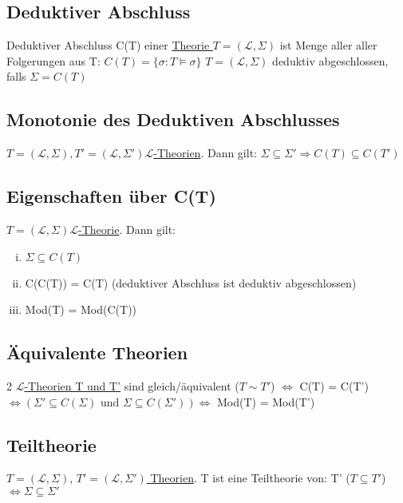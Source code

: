 \documentclass[12pt,a4paper]{article} %
\begin{document}
	\subsection{Deduktiver Abschluss}
	Deduktiver Abschluss C(T) einer \hyperref[Theorie]{Theorie $T = (\mathcal{L}, \Sigma)$} ist Menge aller aller Folgerungen aus T: $C(T) = \{\sigma : T \hyperref[Erfullbar]{\vDash} \sigma\}$ \newline
	$T = (\mathcal{L}, \Sigma)$ deduktiv abgeschlossen, falls $\Sigma = C(T)$
	
	\subsection{Monotonie des Deduktiven Abschlusses}
	\hyperref[Theorie]{$T = (\mathcal{L}, \Sigma), T' = (\mathcal{L}, \Sigma') \mathcal{L}$-Theorien}. Dann gilt: $\Sigma \subseteq \Sigma' \Rightarrow C(T) \subseteq C(T')$
	
	\subsection{Eigenschaften über C(T)}
	\hyperref[Theorie]{$T = (\mathcal{L}, \Sigma) \mathcal{L}$-Theorie}. Dann gilt: 
	\begin{enumerate}[(i)]
		\item $\Sigma \subseteq C(T)$
		\item C(C(T)) = C(T) (deduktiver Abschluss ist deduktiv abgeschlossen)
		\item Mod(T) = Mod(C(T))
	\end{enumerate}

	\subsection{Äquivalente Theorien}
	2 \hyperref[Theorie]{$\mathcal{L}$-Theorien T und T'} sind gleich/äquivalent ($T \sim T'$) $\Leftrightarrow$ C(T) = C(T') $\Leftrightarrow (\Sigma' \subseteq C(\Sigma) \text{ und } \Sigma \subseteq C(\Sigma')) \Leftrightarrow$ Mod(T) = Mod(T')
	
	\subsection{Teiltheorie}
	$T = (\mathcal{L}, \Sigma)$, \hyperref[Theorie]{$T' = (\mathcal{L}, \Sigma')$ Theorien}. T ist eine Teiltheorie von: \newline
	T' ($T \subseteq T'$) $\Leftrightarrow \Sigma \subseteq \Sigma'$
	
\end{document}
